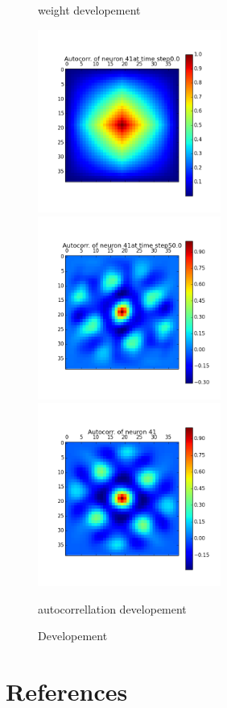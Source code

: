 \documentclass[a4paper, 12pt]{article}
\begin{document}
\begin{figure}[htbp]
\begin{minipage}[hbt]{0,49\textwidth}
        \caption{weight developement}
        \label{LabelA}
\end{minipage}
\begin{minipage}[hbt]{0,49\textwidth}
        \centering
\includegraphics[width=6cm,height=6cm]{neurons/neuron_a_41_t_0.png}\\[10pt]
\includegraphics[width=6cm,height=6cm]{neurons/neuron_a_41_t_50.png}\\[10pt]
\includegraphics[width=6cm,height=6cm]{neurons/neuron_a_41.png}
        \caption{autocorrellation developement}
        \label{LabelB}
\end{minipage}
\centering
\caption{Developement }
\end{figure}

\section{References}
\end{document}
